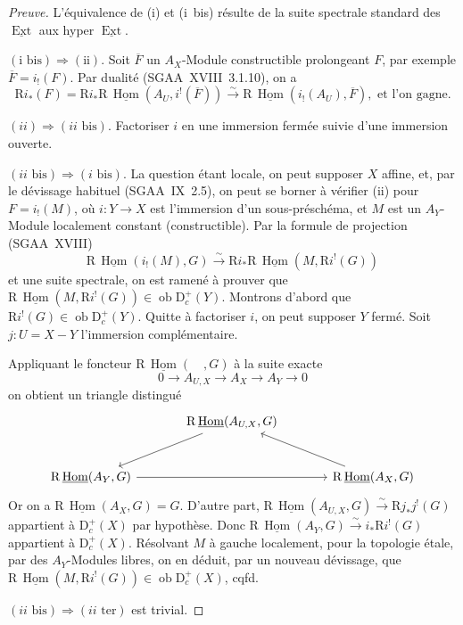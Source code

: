 \documentclass[11pt]{article}
\DeclareMathOperator{\Hom}{Hom}
\DeclareMathOperator{\Ext}{Ext}
\newcommand{\R}{\mathrm{R}}\newcommand{\RHomCore}{\mathrm{RHom}}
\newcommand{\D}{\mathrm{D}}
\newcommand{\ob}{\operatorname{ob}}
\newcommand{\ol}[1]{\overline{#1}}
\providecommand{\Hom}{\operatorname{Hom}}
\providecommand{\ob}{\operatorname{ob}}
\providecommand{\R}{\mathrm R}
\providecommand{\Hom}{\operatorname{Hom}}
\begin{document}
\begin{proof}[Preuve]
L'équivalence de (i) et (i~bis) résulte de la suite spectrale standard des $\underline{\Ext}$ aux hyper $\underline{\Ext}$.

$(\text{i~bis}) \Rightarrow (\text{ii})$. Soit $\ol{F}$ un $A_X$-Module constructible prolongeant $F$, par exemple $\ol{F} = i_{!}(F)$. Par dualité (SGAA~XVIII~3.1.10), on a
\[
\R i_{*}(F) = \R i_{*} \R\,\underline{\Hom}(A_U, i^{!}(\ol{F})) \xrightarrow{\sim} \R\,\underline{\Hom}(i_{!}(A_U), \ol{F}), \text{ et l'on gagne.}
\]

$(ii) \Rightarrow (ii\text{~bis})$. Factoriser $i$ en une immersion fermée suivie d'une immersion ouverte.

$(ii\text{~bis}) \Rightarrow (i\text{~bis})$. La question étant locale, on peut supposer $X$ affine, et, par le dévissage habituel (SGAA~IX~2.5), on peut se borner à vérifier (ii) pour $F = i_{!}(M)$, où $i : Y \to X$ est l'immersion d'un sous-préschéma, et $M$ est un $A_Y$-Module localement constant (constructible). Par la formule de projection (SGAA~XVIII)
\[
\R\,\underline{\Hom}(i_{!}(M), G) \xrightarrow{\sim} \R i_{*} \R\,\underline{\Hom}(M, \R i^{!}(G))
\]
et une suite spectrale, on est ramené à prouver que $\R\,\underline{\Hom}(M, \R i^{!}(G)) \in \ob \D_c^{+}(Y)$. Montrons d'abord que $\R i^{!}(G) \in \ob \D_c^{+}(Y)$. Quitte à factoriser $i$, on peut supposer $Y$ fermé. Soit $j : U = X - Y$ l'immersion complémentaire.

Appliquant le foncteur $\R\,\underline{\Hom}(\quad, G)$ à la suite exacte
\[
0 \longrightarrow A_{U,X} \longrightarrow A_X \longrightarrow A_Y \longrightarrow 0
\]
on obtient un triangle distingué
\[
\begin{tikzcd}[column sep=large,row sep=large]
& \R\,\underline{\Hom}(A_{U,X}, G) \arrow[dl] & \\
\R\,\underline{\Hom}(A_Y, G) \arrow[rr] & & \R\,\underline{\Hom}(A_X, G) \arrow[ul]
\end{tikzcd}
\]
Or on a $\R\,\underline{\Hom}(A_X, G) = G$. D'autre part, $\R\,\underline{\Hom}(A_{U,X}, G) \xrightarrow{\sim} \R j_{*} j^{!}(G)$ appartient à $\D_c^{+}(X)$ par hypothèse. Donc $\R\,\underline{\Hom}(A_Y, G) \xrightarrow{\sim} i_{*} \R i^{!}(G)$ appartient à $\D_c^{+}(X)$. Résolvant $M$ à gauche localement, pour la topologie étale, par des $A_Y$-Modules libres, on en déduit, par un nouveau dévissage, que $\R\,\underline{\Hom}(M, \R i^{!}(G)) \in \ob \D_c^{+}(X)$, cqfd.

$(ii\text{~bis}) \Rightarrow (ii\text{~ter})$ est trivial.


\end{proof}
\end{document}
